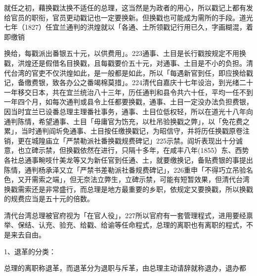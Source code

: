 
\noindent 就任之初，藉换戳汰换不适任的总理，这当然是为政者的用心，所以戳记上都有发给官员的职衔，官员更动戳记也一定要换新。但换戳也可能成为需所的手段。道光七年（1827）任宜兰通判的洪煌就以「各通、土所领戳记行用已久，字画糊混，着即缴销




\noindent 换给，每戳派出番银五十元，以供费用」。223通事、土目是长行戳按规定不用换戳，洪煌还是假借名目换戳，且每戳要价五十元，对通事、土目是不小的负担。清代台湾的官吏不仅洪煌如此，是一般都是如此，所以「每遇新官到任，即应换给戳记，备缴费银，致各办公之番竭棉莫措」。224清代自嘉庆十七年设治，到光绪二十一年移交日本，共在宜兰统治八十三年，历任通判和县令共六十任，平均一任不到一年四个月，如每次通判或县令上任都要换戳，通事、土目一定没办法负担费银，因当时宜兰已设番总理主理番社事务，通事、土目位低权轻，所以在道光十八年向通判陈情，希望通事、土目「毋庸官为饬充，以杜吊验换戳之弊」，以「免花费之累」，当时通判阎圻免通事、土目按任缴换戳记，为昭信守，并将历任换戳原卷注销，更在城隍庙立「严禁勒派社番换戳规费碑记」225示禁。阎圻表现出十分诚意，也立碑示禁，但换戳依然在进行，只隔十多年，在咸丰八年(1855）东、西势各社总通事畹吱什美龙等又为新任官到任通、土，就要缴换记，备贴费银的事提出陈情，通判杨承泽又立「严禁书差勒派社番规费碑记」，226重申「不得巧立吊验名色，又开需索之端」，但无奈法立弊生，立碑示禁，可能有短暂效果，但清代台湾换戳需索还是非常盛行，而总理是地方最重要的乡职，依规定又要换戳，所以换戳的规费应当是五十元的倍数。


清代台湾总理被官府视为「在官人役」，227所以官府有一套管理程式，进用要经禀举、保结、认充、验充、给戳、给谕等任命程式，总理的离职也有离职的程式，不是来去自由。

1、退革的分类：

总理的离职称退革，而退革分为退职与斥革，由总理主动请辞就称退办，退办都

\vfill
\begin{BookNotes}
\end{BookNotes}

